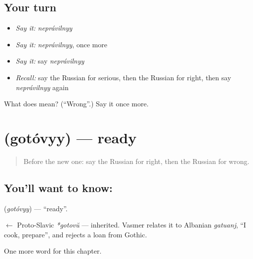 \subsection*{Your turn}
\begin{itemize}
\raggedright
  \item \emph{Say it:} \emph{neprávilnyy}
  \item \emph{Say it:} \emph{neprávilnyy}, once more
  \item \emph{Say it:} say \emph{neprávilnyy}
  \item \emph{Recall:} say the Russian for serious, then the Russian for right, then say \emph{neprávilnyy} again
\end{itemize}

\begin{tcolorbox}[breakable,colback=teal!4,colframe=teal!35!black,title={Before you move on}]
What does  mean? (\textquotedblleft{}Wrong\textquotedblright{}.) Say it once more.
\end{tcolorbox}
\section[\texorpdfstring{\ru{готовый} (gotóvyy)}{готовый (gotóvyy)}]{ (gotóvyy) — ready}

\label{lesson:RU-C128-ready}



\begin{quote}
Before the new one: say the Russian for right, then the Russian for wrong.
\end{quote}

\subsection*{You'll want to know: }
\textbf{} (\emph{gotóvyy}) — \textquotedblleft{}ready\textquotedblright{}.

\begin{cousinweb}
\textbf{} $\leftarrow$ Proto-Slavic \emph{*gotovŭ} — inherited. Vasmer relates it to Albanian \emph{gatuanj}, \textquotedblleft{}I cook, prepare\textquotedblright{}, and rejects a loan from Gothic.
\end{cousinweb}

\begin{grammarlens}[title={What you've built}]
One more word for this chapter.
\end{grammarlens}

